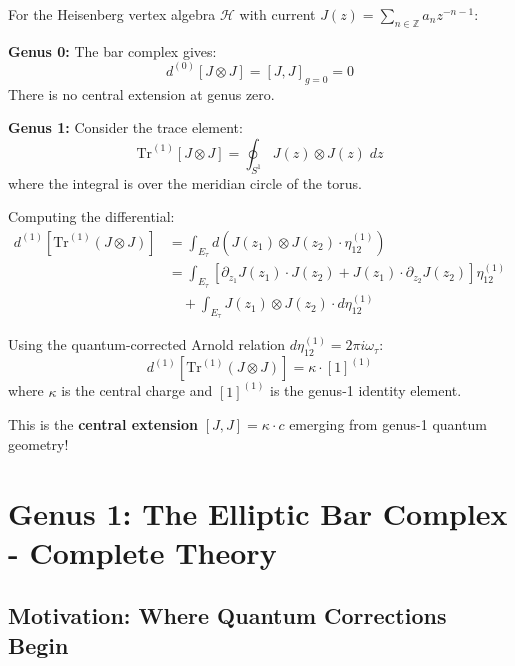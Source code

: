 \begin{example}
\label{ex:heisenberg-genus-1}
For the Heisenberg vertex algebra $\mathcal{H}$ with current $J(z) = \sum_{n \in \mathbb{Z}} a_n z^{-n-1}$:

\textbf{Genus 0:} The bar complex gives:
\begin{equation}
d^{(0)}[J \otimes J] = [J, J]_{g=0} = 0
\end{equation}
There is no central extension at genus zero.

\textbf{Genus 1:} Consider the trace element:
\begin{equation}
\text{Tr}^{(1)}[J \otimes J] = \oint_{S^1} J(z) \otimes J(z) \; dz
\end{equation}
where the integral is over the meridian circle of the torus.

Computing the differential:
\begin{align}
d^{(1)}[\text{Tr}^{(1)}(J \otimes J)] &= \int_{E_\tau} d\left(J(z_1) \otimes J(z_2) \cdot \eta_{12}^{(1)}\right)\\
&= \int_{E_\tau} \left[\partial_{z_1} J(z_1) \cdot J(z_2) + J(z_1) \cdot \partial_{z_2} J(z_2)\right] \eta_{12}^{(1)}\\
&\quad + \int_{E_\tau} J(z_1) \otimes J(z_2) \cdot d\eta_{12}^{(1)}
\end{align}

Using the quantum-corrected Arnold relation $d\eta_{12}^{(1)} = 2\pi i \omega_\tau$:
\begin{equation}
d^{(1)}[\text{Tr}^{(1)}(J \otimes J)] = \kappa \cdot [1]^{(1)}
\end{equation}
where $\kappa$ is the central charge and $[1]^{(1)}$ is the genus-1 identity element.

This is the \textbf{central extension} $[J, J] = \kappa \cdot c$ emerging from genus-1 quantum geometry!
\end{example}


\section{Genus 1: The Elliptic Bar Complex - Complete Theory}
\label{sec:genus-1-elliptic-complete}

\subsection{Motivation: Where Quantum Corrections Begin}


